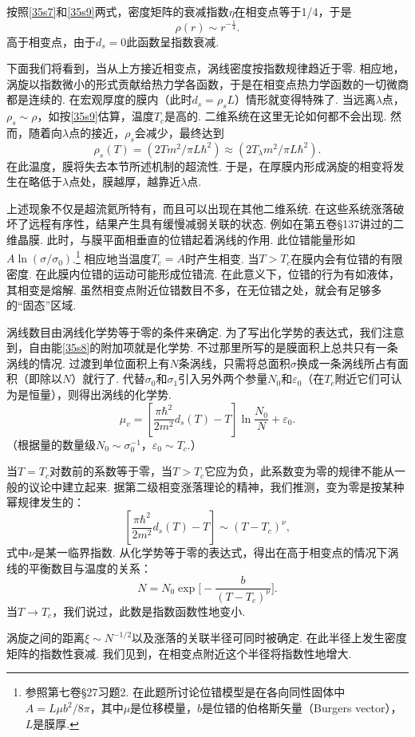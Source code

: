 按照\eqref{35s7}和\eqref{35s9}两式，密度矩阵的衰减指数$\eta$在相变点等于1/4，于是
\begin{equation*}
\rho(r)\sim r^{-\frac{1}{4}}.
\tag{35*.10}
\label{35s10}
\end{equation*}
高于相变点，由于$d_{s}=0$此函数呈指数衰减.

下面我们将看到，当从上方接近相变点，涡线密度按指数规律趋近于零. 相应地，涡旋以指数微小的形式贡献给热力学各函数，于是在相变点热力学函数的一切微商都是连续的. 在宏观厚度的膜内（此时$d_{s}=\rho_{s}L$）情形就变得特殊了. 当远离$\lambda$点，$\rho_{s}\sim\rho$，如按\eqref{35s9}估算，温度$T_{c}$是高的. 二维系统在这里无论如何都不会出现. 然而，随着向$\lambda$点的接近，$\rho_{s}$会减少，最终达到
\begin{equation*}
\rho_{s}(T)=(2Tm^{2}/\pi L\hbar^{2})\approx(2T_{\lambda}m^{2}/\pi L\hbar^{2}).
\end{equation*}
在此温度，膜将失去本节所述机制的超流性. 于是，在厚膜内形成涡旋的相变将发生在略低于$\lambda$点处，膜越厚，越靠近$\lambda$点.

上述现象不仅是超流氦所特有，而且可以出现在其他二维系统. 在这些系统涨落破坏了远程有序性，结果产生具有缓慢减弱关联的状态. 例如在第五卷§137讲过的二维晶膜. 此时，与膜平面相垂直的位错起着涡线的作用. 此位错能量形如$A\ln(\sigma/\sigma_{0})$.\footnote{参照第七卷§27习题2. 在此题所讨论位错模型是在各向同性固体中$A=L\mu b^{2}/8\pi$，其中$\mu$是位移模量，$b$是位错的伯格斯矢量（Burgers vector），$L$是膜厚.} 相应地当温度$T_{c}=A$时产生相变. 当$T>T_{c}$在膜内会有位错的有限密度. 在此膜内位错的运动可能形成位错流. 在此意义下，位错的行为有如液体，其相变是熔解. 虽然相变点附近位错数目不多，在无位错之处，就会有足够多的“固态”区域.

涡线数目由涡线化学势等于零的条件来确定. 为了写出化学势的表达式，我们注意到，自由能\eqref{35s8}的附加项就是化学势. 不过那里所写的是膜面积上总共只有一条涡线的情况. 过渡到单位面积上有$N$条涡线，只需将总面积$\sigma$换成一条涡线所占有面积（即除以$N$）就行了. 代替$\sigma_{0}$和$\sigma_{1}$引入另外两个参量$N_{0}$和$\varepsilon_{0}$（在$T_{c}$附近它们可认为是恒量），则得出涡线的化学势.
\begin{equation*}
\mu_{v}=\left[\frac{\pi\hbar^{2}}{2m^{2}}d_{s}(T)-T\right]\ln\frac{N_{0}}{N}+\varepsilon_{0}.
\tag{35*.11}
\label{35s11}
\end{equation*}
（根据量的数量级$N_{0}\sim\sigma_{0}^{-1}$，$\varepsilon_{0}\sim T_{c}$.）

当$T=T_{c}$对数前的系数等于零，当$T>T_{c}$它应为负，此系数变为零的规律不能从一般的议论中建立起来. 据第二级相变涨落理论的精神，我们推测，变为零是按某种幂规律发生的：
\begin{equation*}
\left[\frac{\pi\hbar^{2}}{2m^{2}}d_{s}(T)-T\right]\sim(T-T_{c})^{\nu},
\end{equation*}
式中$\nu$是某一临界指数. 从化学势等于零的表达式，得出在高于相变点的情况下涡线的平衡数目与温度的关系：
\begin{equation*}
N=N_{0}\exp\bigg[-\frac{b}{(T-T_{c})^{\nu}}\bigg].
\tag{35*.12}
\label{35s12}
\end{equation*}
当$T\to T_{c}$，我们说过，此数是指数函数性地变小.

涡旋之间的距离$\xi\sim N^{-1/2}$以及涨落的关联半径可同时被确定. 在此半径上发生密度矩阵的指数性衰减. 我们见到，在相变点附近这个半径将指数性地增大.
